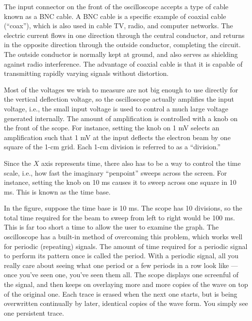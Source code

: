 The input connector on the front of the oscilloscope
accepts a type of cable
known as a BNC cable.
A BNC cable is a specific example of coaxial cable
(``coax''), which is also used in cable TV, radio, and
computer networks. The electric current flows in one direction
through the central conductor, and returns in the opposite
direction through the outside conductor, completing the
circuit. The outside conductor is normally kept at ground,
and also serves as shielding against radio interference. 
The advantage of coaxial cable is that it is capable of
transmitting rapidly varying signals without distortion.


Most of the voltages we wish to measure are not big enough
to use directly for the vertical deflection voltage, so the
oscilloscope actually amplifies the input voltage, i.e., the
small input voltage is used to control a much large voltage
generated internally. The amount of amplification is
controlled with a knob on the front of the scope. For
instance, setting the knob on 1 mV selects an amplification
such that 1 mV at the input deflects the electron beam by
one square of the 1-cm grid. Each 1-cm division is referred
to as a ``division.''



Since the $X$ axis represents time, there also has to be a way
to control the time scale, i.e., how fast the imaginary
``penpoint'' sweeps across the screen. For instance, setting
the knob on 10 ms causes it to sweep across one square
in 10 ms. This is known as the time base.

In the figure, suppose the time base is 10 ms.
The scope has 10
divisions, so the total time required for the beam to sweep
from left to right would be 100 ms. This is far too short a
time to allow the user to examine the graph.
The oscilloscope has a built-in method of overcoming this
problem, which works well for periodic (repeating)
signals. The amount of
time required for a periodic signal to perform its pattern
once is called the period. With a periodic signal, all you
really care about seeing what one period or a few periods in
a row look like --- once you've seen one, you've seen them
all. The scope displays one screenful of the
signal, and then keeps on overlaying more and more copies of
the wave on top of the original one. Each
trace is erased when the next one starts, but is being overwritten
continually by later, identical copies of the wave form. You
simply see one persistent trace.\label{fig:em-osc-waveform} %

